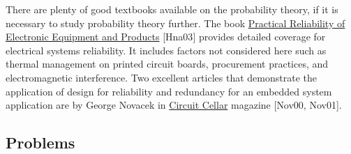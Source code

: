 There are plenty of good textbooks available on the probability theory,
if it is necessary to study probability theory further. The book
\ul{Practical Reliability of Electronic Equipment and Products}
{[}Hna03{]} provides detailed coverage for electrical systems
reliability. It includes factors not considered here such as thermal
management on printed circuit boards, procurement practices, and
electromagnetic interference. Two excellent articles that demonstrate
the application of design for reliability and redundancy for an embedded
system application are by George Novacek in \ul{Circuit Cellar} magazine
{[}Nov00, Nov01{]}.

\subsection{Problems}\label{problems}

